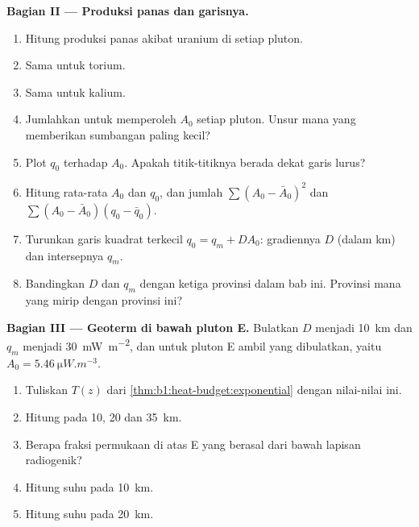 \begin{problem}
\noindent\textbf{Bagian II --- Produksi panas dan garisnya.}
\begin{enumerate}[resume]
  \item Hitung produksi panas akibat uranium di setiap pluton.
  \item Sama untuk torium.
  \item Sama untuk kalium.
  \item Jumlahkan untuk memperoleh $A_0$ setiap pluton. Unsur mana yang memberikan sumbangan paling kecil?
  \item Plot $q_0$ terhadap $A_0$. Apakah titik-titiknya berada dekat garis lurus?
  \item Hitung rata-rata $A_0$ dan $q_0$, dan jumlah
        $\sum (A_0 - \bar A_0)^2$ dan $\sum (A_0 - \bar A_0)(q_0 - \bar q_0)$.
  \item Turunkan garis kuadrat terkecil $q_0 = q_m + D A_0$: gradiennya $D$ (dalam
        \unit{km}) dan intersepnya $q_m$.
  \item Bandingkan $D$ dan $q_m$ dengan ketiga provinsi dalam bab ini. Provinsi mana yang mirip dengan provinsi ini?
\end{enumerate}

\noindent\textbf{Bagian III --- Geoterm di bawah pluton E.}
Bulatkan $D$ menjadi \qty{10}{km} dan $q_m$ menjadi \qty{30}{mW.m^{-2}}, dan untuk
pluton E ambil yang dibulatkan, yaitu $A_0 = \qty{5.46}{\micro W.m^{-3}}$.
\begin{enumerate}[resume]
  \item Tuliskan  $T(z)$ dari \cref{thm:b1:heat-budget:exponential} dengan nilai-nilai ini.
  \item Hitung  pada 10, 20 dan \qty{35}{km}.
  \item Berapa fraksi  permukaan di atas E yang berasal dari bawah lapisan radiogenik?
  \item Hitung suhu pada \qty{10}{km}.
  \item Hitung suhu pada \qty{20}{km}.
\end{enumerate}


\end{problem}
